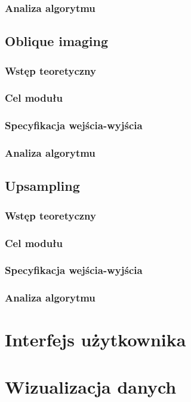 \documentclass[12]{article}
\begin{document}
		\subsubsection{Analiza algorytmu}
		\newpage
	\subsection{Oblique imaging}
		\subsubsection{Wstęp teoretyczny}
		\subsubsection{Cel modułu}
		\subsubsection{Specyfikacja wejścia-wyjścia}
		\subsubsection{Analiza algorytmu}
		\newpage
	\subsection{Upsampling}
		\subsubsection{Wstęp teoretyczny}
		\subsubsection{Cel modułu}
		\subsubsection{Specyfikacja wejścia-wyjścia}
		\subsubsection{Analiza algorytmu}
		\newpage
	\section{Interfejs użytkownika}
	\newpage
	\section{Wizualizacja danych}
	\newpage
	\begin{thebibliography}{99}
		
	\end{thebibliography}
\end{document}

